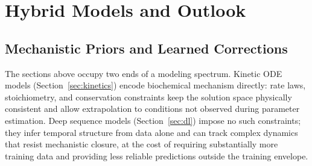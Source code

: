 \section{Hybrid Models and Outlook}\label{sec:hybrid}

\subsection{Mechanistic Priors and Learned Corrections}

The sections above occupy two ends of a modeling spectrum.  Kinetic ODE models
(Section~\ref{sec:kinetics}) encode biochemical mechanism directly: rate laws,
stoichiometry, and conservation constraints keep the solution space physically
consistent and allow extrapolation to conditions not observed during parameter
estimation.  Deep sequence models (Section~\ref{sec:dl}) impose no such
constraints; they infer temporal structure from data alone and can track complex
dynamics that resist mechanistic closure, at the cost of requiring substantially
more training data and providing less reliable predictions outside the training
envelope.

